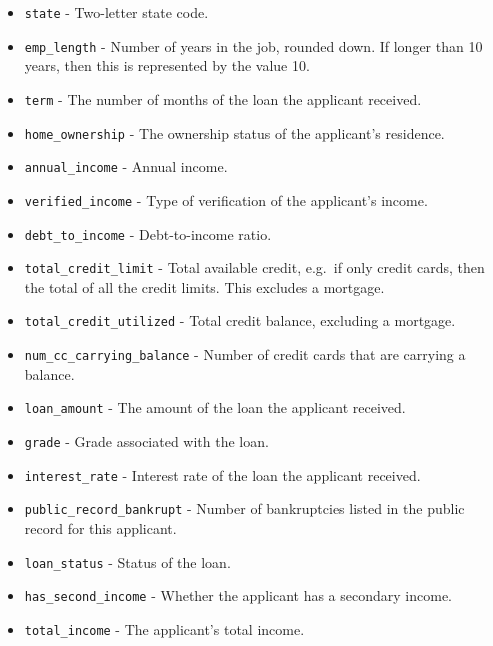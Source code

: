 \documentclass[
  letterpaper,
  DIV=11,
  numbers=noendperiod]{scrreprt}
\begin{document}
\begin{itemize}
\item
  \texttt{state} - Two-letter state code.
\item
  \texttt{emp\_length} - Number of years in the job, rounded down. If
  longer than 10 years, then this is represented by the value 10.
\item
  \texttt{term} - The number of months of the loan the applicant
  received.
\item
  \texttt{home\_ownership} - The ownership status of the applicant's
  residence.
\item
  \texttt{annual\_income} - Annual income.
\item
  \texttt{verified\_income} - Type of verification of the applicant's
  income.
\item
  \texttt{debt\_to\_income} - Debt-to-income ratio.
\item
  \texttt{total\_credit\_limit} - Total available credit, e.g.~if only
  credit cards, then the total of all the credit limits. This excludes a
  mortgage.
\item
  \texttt{total\_credit\_utilized} - Total credit balance, excluding a
  mortgage.
\item
  \texttt{num\_cc\_carrying\_balance} - Number of credit cards that are
  carrying a balance.
\item
  \texttt{loan\_amount} - The amount of the loan the applicant received.
\item
  \texttt{grade} - Grade associated with the loan.
\item
  \texttt{interest\_rate} - Interest rate of the loan the applicant
  received.
\item
  \texttt{public\_record\_bankrupt} - Number of bankruptcies listed in
  the public record for this applicant.
\item
  \texttt{loan\_status} - Status of the loan.
\item
  \texttt{has\_second\_income} - Whether the applicant has a secondary
  income.
\item
  \texttt{total\_income} - The applicant's total income.
\end{itemize}
\end{document}
